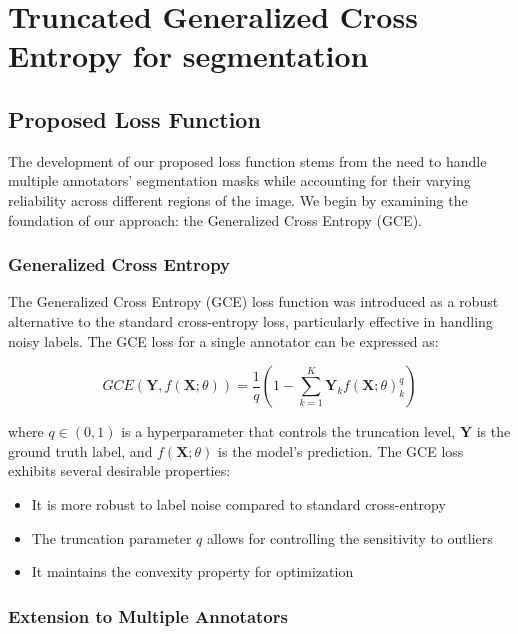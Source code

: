 \chapter{Truncated Generalized Cross Entropy for
segmentation}\label{ch:seg_tgce}

\section{Proposed Loss Function}

The development of our proposed loss function stems from the need to
handle multiple annotators' segmentation masks while accounting for
their varying reliability across different regions of the image. We
begin by examining the foundation of our approach: the Generalized
Cross Entropy (GCE).

\subsection{Generalized Cross Entropy}

The Generalized Cross Entropy (GCE) loss function was introduced as a
robust alternative to the standard cross-entropy loss, particularly
effective in handling noisy labels. The GCE loss for a single
annotator can be expressed as:

\begin{equation}
  GCE(\mathbf{Y}, f(\mathbf{X};\theta)) = \frac{1}{q}\left(1 -
  \sum_{k=1}^K \mathbf{Y}_k f(\mathbf{X};\theta)_k^q\right)
\end{equation}

where $q \in (0,1)$ is a hyperparameter that controls the truncation
level, $\mathbf{Y}$ is the ground truth label, and
$f(\mathbf{X};\theta)$ is the model's prediction. The GCE loss
exhibits several desirable properties:

\begin{itemize}
  \item It is more robust to label noise compared to standard cross-entropy
  \item The truncation parameter $q$ allows for controlling the
    sensitivity to outliers
  \item It maintains the convexity property for optimization
\end{itemize}

\subsection{Extension to Multiple Annotators}

